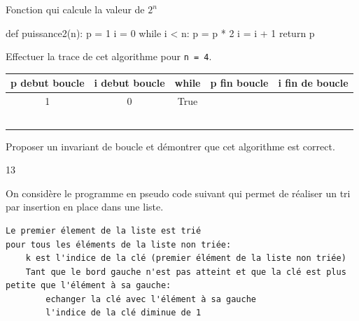 \documentclass[a4paper,10pt]{report}
\def\ptsexoD{5}
\begin{document}
\begin{enumerate}

    
\begin{minipage}{0.29\linewidth}
    Fonction qui calcule la valeur de $2^n$

\begin{CodePythontexAlt}[Largeur=1\linewidth,Centre,PremLigne=1]{}
def puissance2(n):
    p = 1
    i = 0
    while i < n:
        p = p * 2
        i = i + 1
    return p
\end{CodePythontexAlt}

\end{minipage}\hfill
\begin{minipage}{0.66\linewidth}
    \item Effectuer la trace de cet algorithme pour \verb|n = 4|.
    
    \medskip

    \begin{tabular}{|c|c|c|c|c|}
        \hline
        p debut boucle& i debut boucle & while &p fin boucle & i fin de boucle\\ \hline
        1&0&True&&\\\hline
        &&&&\\\hline
        &&&&\\\hline
        &&&&\\\hline
        &&&&\\\hline
        &&&&\\\hline


    \end{tabular}
\end{minipage}


    
    
    \item Proposer un invariant de boucle et démontrer que cet algorithme est correct.

    \begin{answer}{1}{3}    \end{answer}

\end{enumerate}



\exods{\ptsexoD}


On considère le programme en pseudo code suivant qui permet de réaliser un tri par insertion en place dans une liste.

\begin{verbatim}
Le premier élement de la liste est trié
pour tous les éléments de la liste non triée:
    k est l'indice de la clé (premier élément de la liste non triée)
    Tant que le bord gauche n'est pas atteint et que la clé est plus petite que l'élément à sa gauche:
        echanger la clé avec l'élément à sa gauche
        l'indice de la clé diminue de 1
\end{verbatim}
\end{document}
